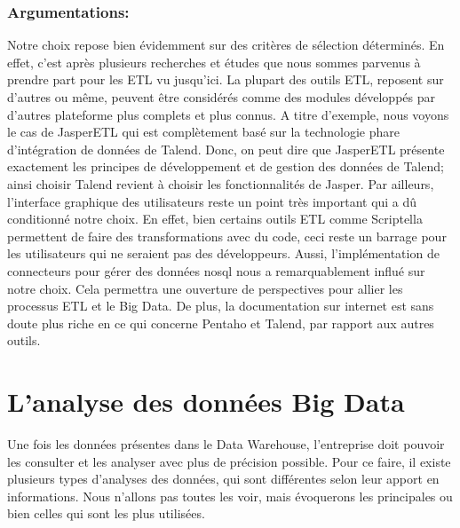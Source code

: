 \documentclass[12pt,a4wide,twoside]{report}
\begin{document}
			\subsubsection{Argumentations:}
			Notre choix repose bien évidemment sur des critères de sélection déterminés. En effet, c'est après plusieurs recherches et études que nous sommes parvenus à prendre part pour les ETL vu jusqu'ici.\newline
			La plupart des outils ETL, reposent sur d'autres ou même, peuvent être considérés comme des modules développés par d'autres plateforme plus complets et plus connus. A titre d'exemple, nous voyons le cas de JasperETL qui est complètement basé sur la technologie phare d’intégration de données de Talend.\cite{misc2} Donc, on peut dire que JasperETL présente exactement les principes de développement et de gestion des données de Talend; ainsi choisir Talend revient à choisir les fonctionnalités de Jasper.\newline
			Par ailleurs, l'interface graphique des utilisateurs reste un point très important qui a dû conditionné notre choix. En effet, bien certains outils ETL comme Scriptella permettent de faire des transformations avec du code, ceci reste un barrage pour les utilisateurs qui ne seraient pas des développeurs.\newline
			Aussi, l'implémentation de connecteurs pour gérer des données nosql nous a remarquablement influé sur notre choix. Cela permettra une ouverture de perspectives pour allier les processus ETL et le Big Data.\newline
			De plus, la documentation sur internet est sans doute plus riche en ce qui concerne Pentaho et Talend, par rapport aux autres outils.\newline
			
			\section{L'analyse des données Big Data}
	Une fois les données présentes dans le Data Warehouse, l'entreprise doit pouvoir les consulter et les analyser avec plus de précision possible. Pour ce faire, il existe plusieurs types d'analyses des données, qui sont différentes selon leur apport en informations. Nous n'allons pas toutes les voir, mais évoquerons les principales ou bien celles qui sont les plus utilisées.\newline
\end{document}
